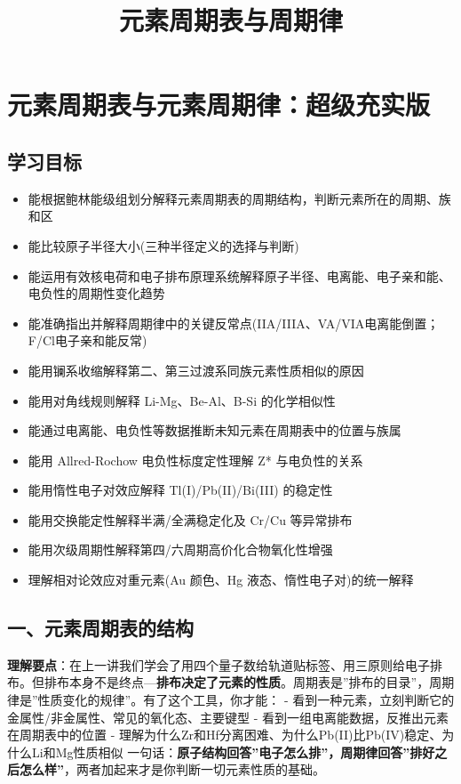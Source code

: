 \documentclass[a4paper,11pt]{ctexart}
\title{元素周期表与周期律}
\date{}
\providecommand{\tightlist}{\setlength{\itemsep}{0pt}\setlength{\parskip}{0pt}}
\newcommand{\箭}{\ensuremath{\rightarrow}}
\newcommand{\左箭}{\ensuremath{\leftarrow}}
\newcommand{\上箭}{\ensuremath{\uparrow}}
\newcommand{\下箭}{\ensuremath{\downarrow}}
\newcommand{\衡}{\ensuremath{\rightleftharpoons}}
\newcommand{\双箭}{\ensuremath{\leftrightarrow}}
\newcommand{\约等于}{\ensuremath{\approx}}
\newcommand{\小于等于}{\ensuremath{\leq}}
\newcommand{\大于等于}{\ensuremath{\geq}}
\newcommand{\不等于}{\ensuremath{\neq}}
\newcommand{\西格马}{\ensuremath{\sigma}}
\newcommand{\派}{\ensuremath{\pi}}
\begin{document}
\maketitle
\tableofcontents
\newpage
\section{元素周期表与元素周期律：超级充实版}\label{ux5143ux7d20ux5468ux671fux8868ux4e0eux5143ux7d20ux5468ux671fux5f8bux8d85ux7ea7ux5145ux5b9eux7248}

\subsection{学习目标}\label{ux5b66ux4e60ux76eeux6807}

\begin{itemize}
\tightlist
\item
  能根据鲍林能级组划分解释元素周期表的周期结构，判断元素所在的周期、族和区
\item
  能比较原子半径大小(三种半径定义的选择与判断)
\item
  能运用有效核电荷和电子排布原理系统解释原子半径、电离能、电子亲和能、电负性的周期性变化趋势
\item
  能准确指出并解释周期律中的关键反常点(IIA/IIIA、VA/VIA电离能倒置；F/Cl电子亲和能反常)
\item
  能用镧系收缩解释第二、第三过渡系同族元素性质相似的原因
\item
  能用对角线规则解释 Li-Mg、Be-Al、B-Si 的化学相似性
\item
  能通过电离能、电负性等数据推断未知元素在周期表中的位置与族属
\item
  能用 Allred-Rochow 电负性标度定性理解 Z* 与电负性的关系
\item
  能用惰性电子对效应解释 Tl(I)/Pb(II)/Bi(III) 的稳定性
\item
  能用交换能定性解释半满/全满稳定化及 Cr/Cu 等异常排布
\item
  能用次级周期性解释第四/六周期高价化合物氧化性增强
\item
  理解相对论效应对重元素(Au 颜色、Hg 液态、惰性电子对)的统一解释
\end{itemize}

\subsection{一、元素周期表的结构}\label{ux4e00ux5143ux7d20ux5468ux671fux8868ux7684ux7ed3ux6784}

\textbf{理解要点}：在上一讲我们学会了用四个量子数给轨道贴标签、用三原则给电子排布。但排布本身不是终点---\textbf{排布决定了元素的性质}。周期表是''排布的目录''，周期律是''性质变化的规律''。有了这个工具，你才能：
- 看到一种元素，立刻判断它的金属性/非金属性、常见的氧化态、主要键型
- 看到一组电离能数据，反推出元素在周期表中的位置
- 理解为什么Zr和Hf分离困难、为什么Pb(II)比Pb(IV)稳定、为什么Li和Mg性质相似
一句话：\textbf{原子结构回答''电子怎么排''，周期律回答''排好之后怎么样''}，两者加起来才是你判断一切元素性质的基础。
\end{document}
